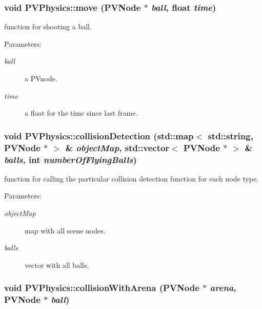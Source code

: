 \subsubsection[{move}]{\setlength{\rightskip}{0pt plus 5cm}void PVPhysics::move ({\bf PVNode} $\ast$ {\em ball}, \/  float {\em time})}\label{class_p_v_physics_ef493f065afc2637f704ec9fd5cb8754}


function for shooting a ball. 

\begin{Desc}
\item[Parameters:]
\begin{description}
\item[{\em ball}]a PVnode. \item[{\em time}]a float for the time since last frame. \end{description}
\end{Desc}
\subsubsection[{collisionDetection}]{\setlength{\rightskip}{0pt plus 5cm}void PVPhysics::collisionDetection (std::map$<$ std::string, {\bf PVNode} $\ast$ $>$ \& {\em objectMap}, \/  std::vector$<$ {\bf PVNode} $\ast$ $>$ \& {\em balls}, \/  int {\em numberOfFlyingBalls})}\label{class_p_v_physics_e56c458a7f62c983e2ab5f903bee9478}


function for calling the particular collision detection function for each node type. 

\begin{Desc}
\item[Parameters:]
\begin{description}
\item[{\em objectMap}]map with all scene nodes. \item[{\em balls}]vector with all balls. \end{description}
\end{Desc}
\subsubsection[{collisionWithArena}]{\setlength{\rightskip}{0pt plus 5cm}void PVPhysics::collisionWithArena ({\bf PVNode} $\ast$ {\em arena}, \/  {\bf PVNode} $\ast$ {\em ball})}\label{class_p_v_physics_35f87bc90c8aae2772d79523bcb4bf77}


